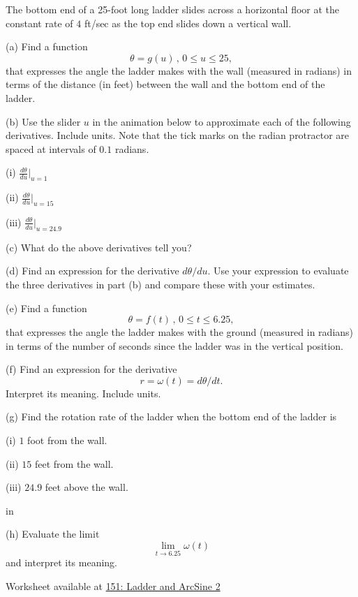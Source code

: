 \documentclass{ximera}
\newcommand{\pskip}{\vskip 0.1 in}
\begin{document}
\begin{question}  \label{Q:dsdfkkkfdvg4}

The bottom end of a 25-foot long ladder slides across a horizontal floor at the constant rate of $4$ ft/sec as the top end slides down a vertical wall. 

(a) Find a function
\[
      \theta = g(u) \, , \, 0\leq u \leq 25 ,
\]
that expresses the angle the ladder makes with the wall (measured in radians) in terms of the distance (in feet) between the wall 
and the bottom end of the ladder.

(b) Use the slider $u$ in the animation below to approximate each of the following derivatives. Include units. Note that the tick marks on the radian protractor are spaced at intervals of $0.1$ radians.

   (i) $\frac{d\theta}{du} \Big|_{u=1}$

   (ii) $\frac{d\theta}{du} \Big|_{u=15}$

    (iii) $\frac{d\theta}{du} \Big|_{u=24.9}$

(c) What do the above derivatives tell you?

(d) Find an expression for the derivative $d\theta/du$. Use your expression to evaluate the three derivatives in part (b) and compare these with your estimates.

(e) Find a function 
\[
       \theta = f(t) \, , \, 0\leq t \leq 6.25 ,
\]
that expresses the angle the ladder makes with the ground (measured in radians) in terms of the number of seconds since the ladder was in the vertical position.

(f) Find an expression for the derivative 
\[
   r=\omega(t)=d\theta/dt. 
\]
Interpret its meaning. Include units.

(g) Find the rotation rate of the ladder when the bottom end of the ladder is 

     (i) $1$ foot from the wall. 

     (ii) $15$ feet from the wall.

     (iii) $24.9$ feet above the wall.

\pskip

(h) Evaluate the limit
\[
   \lim_{t\to 6.25} \omega(t) 
\]
and interpret its meaning.
 


\begin{onlineOnly}
    \begin{center}
\end{center}
\end{onlineOnly}

Worksheet available at \href{https://www.desmos.com/calculator/g6fuhqff02}{151: Ladder and ArcSine 2}

\end{question}
\end{document}
